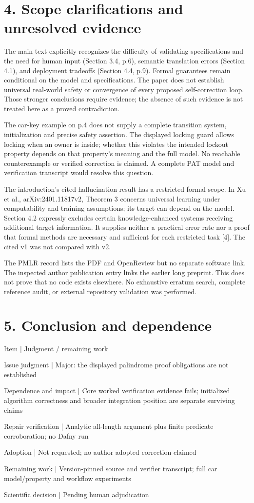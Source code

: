 \documentclass[10pt]{article}
\begin{document}
\section*{4. Scope clarifications and unresolved evidence}
The main text explicitly recognizes the difficulty of validating specifications and the need for human input (Section 3.4, p.6), semantic translation errors (Section 4.1), and deployment tradeoffs (Section 4.4, p.9). Formal guarantees remain conditional on the model and specifications. The paper does not establish universal real-world safety or convergence of every proposed self-correction loop. Those stronger conclusions require evidence; the absence of such evidence is not treated here as a proved contradiction.\par
The car-key example on p.4 does not supply a complete transition system, initialization and precise safety assertion. The displayed locking guard allows locking when an owner is inside; whether this violates the intended lockout property depends on that property’s meaning and the full model. No reachable counterexample or verified correction is claimed. A complete PAT model and verification transcript would resolve this question.\par
The introduction’s cited hallucination result has a restricted formal scope. In Xu et al., arXiv:2401.11817v2, Theorem 3 concerns universal learning under computability and training assumptions; its target can depend on the model. Section 4.2 expressly excludes certain knowledge-enhanced systems receiving additional target information. It supplies neither a practical error rate nor a proof that formal methods are necessary and sufficient for each restricted task [4]. The cited v1 was not compared with v2.\par
The PMLR record lists the PDF and OpenReview but no separate software link. The inspected author publication entry links the earlier long preprint. This does not prove that no code exists elsewhere. No exhaustive erratum search, complete reference audit, or external repository validation was performed.\par
\section*{5. Conclusion and dependence}
Item | Judgment / remaining work\par
Issue judgment | Major: the displayed palindrome proof obligations are not established\par
Dependence and impact | Core worked verification evidence fails; initialized algorithm correctness and broader integration position are separate surviving claims\par
Repair verification | Analytic all-length argument plus finite predicate corroboration; no Dafny run\par
Adoption | Not requested; no author-adopted correction claimed\par
Remaining work | Version-pinned source and verifier transcript; full car model/property and workflow experiments\par
Scientific decision | Pending human adjudication\par
\end{document}
